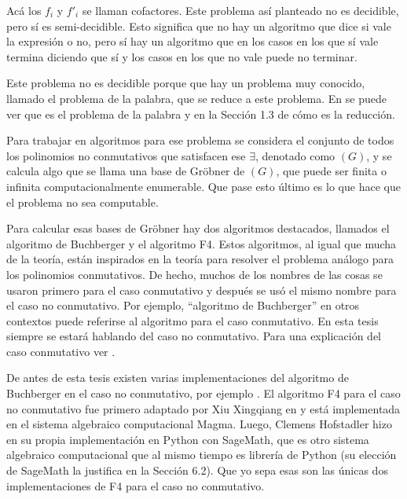 \documentclass[12pt]{report}
\theoremstyle{customstyle}
\theoremstyle{factstyle}
\begin{document}
Acá los $f_i$ y $f'_i$ se llaman cofactores. Este problema así planteado no es decidible, pero sí es semi-decidible. Esto significa que no hay un algoritmo que dice si vale la expresión o no, pero sí hay un algoritmo que en los casos en los que sí vale termina diciendo que sí y los casos en los que no vale puede no terminar.

Este problema no es decidible porque que hay un problema muy conocido, llamado el problema de la palabra, que se reduce a este problema. En \cite{web:wiki:WordPproblem} se puede ver que es el problema de la palabra y en la Sección 1.3 de \cite{article:MORA1994131} cómo es la reducción.

Para trabajar en algoritmos para ese problema se considera el conjunto de todos los polinomios no conmutativos que satisfacen ese $∃$, denotado como $(G)$, y se calcula algo que se llama una base de Gröbner de $(G)$, que puede ser finita o infinita computacionalmente enumerable. Que pase esto último es lo que hace que el problema no sea computable. %

Para calcular esas bases de Gröbner hay dos algoritmos destacados, llamados el algoritmo de Buchberger y el algoritmo F4. Estos algoritmos, al igual que mucha de la teoría, están inspirados en la teoría para resolver el problema análogo para los polinomios conmutativos. De hecho, muchos de los nombres de las cosas se usaron primero para el caso conmutativo y después se usó el mismo nombre para el caso no conmutativo. Por ejemplo, ``algoritmo de Buchberger'' en otros contextos puede referirse al algoritmo para el caso conmutativo. En esta tesis siempre se estará hablando del caso no conmutativo. Para una explicación del caso conmutativo ver \cite{book:ideals-varieties-algorithms}.

De antes de esta tesis existen varias implementaciones del algoritmo de Buchberger en el caso no conmutativo, por ejemplo \cite{lib:GBNP, lib:DGPS, lib:NCAlgebra}. El algoritmo F4 para el caso no conmutativo fue primero adaptado por Xiu Xingqiang en \cite{phdthesis:XiuXingqiang12} y está implementada en el sistema algebraico computacional Magma. Luego, Clemens Hofstadler hizo en \cite{thesis:Hof20} su propia implementación en Python con SageMath, que es otro sistema algebraico computacional que al mismo tiempo es librería de Python (su elección de SageMath la justifica en la Sección 6.2). Que yo sepa esas son las únicas dos implementaciones de F4 para el caso no conmutativo.
\end{document}
